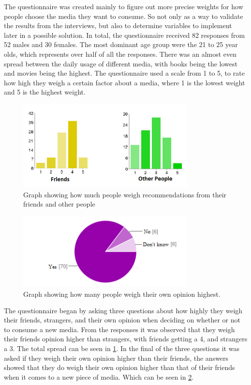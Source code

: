 The questionnaire was created mainly to figure out more precise weights for how people choose the media they want to consume. So not only as a way to validate the results from the interviews, but also to determine variables to implement later in a possible solution.
In total, the questionnaire received 82 responses from 52 males and 30 females. The most dominant age group were the 21 to 25 year olds, which represents over half of all the responses. There was an almost even spread between the daily usage of different media, with books being the lowest and movies being the highest.
The questionnaire used a scale from 1 to 5, to rate how high they weigh a certain factor about a media, where 1 is the lowest weight and 5 is the highest weight.

\begin{figure}[htb]
\centering
\includegraphics[width=0.8\textwidth]{Images/people.png}
\caption{Graph showing how much people weigh recommendations from their friends and other people}
\label{People}
\end{figure}

\begin{figure}[htb]
\centering
\includegraphics[width=0.8\textwidth]{Images/own.png}
\caption{Graph showing how many people weigh their own opinion highest.}
\label{Own}
\end{figure}

The questionnaire began by asking three questions about how highly they weigh their friends, strangers, and their own opinion when deciding on whether or not to consume a new media. From the responses it was observed that they weigh their friends opinion higher than strangers, with friends getting a 4, and strangers a 3. The total spread can be seen in \ref{People}. In the final of the three questions it was asked if they weigh their own opinion higher than their friends,  the answers showed that they do weigh their own opinion higher than that of their friends when it comes to a new piece of media. Which can be seen in \ref{Own}.

